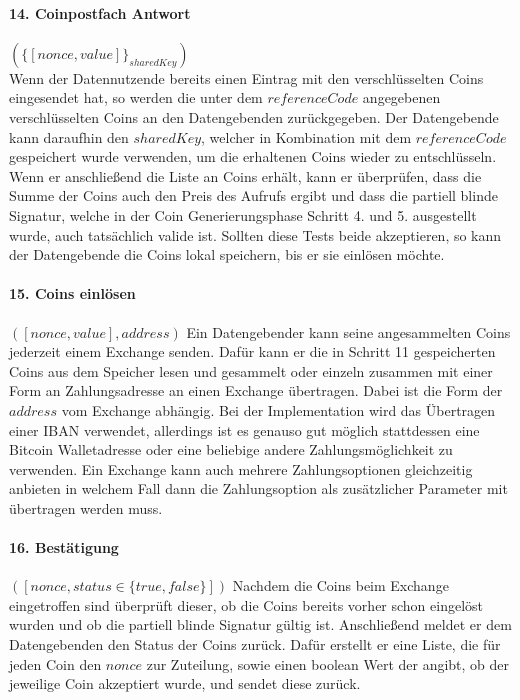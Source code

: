 \documentclass{scrreprt}
\begin{document}
\paragraph{14. Coinpostfach Antwort} $(\{[nonce,value]\}_{sharedKey})$\\
Wenn der Datennutzende bereits einen Eintrag mit den verschlüsselten Coins eingesendet hat, so werden die unter dem $referenceCode$ angegebenen verschlüsselten Coins an den Datengebenden zurückgegeben. Der Datengebende kann daraufhin den $sharedKey$, welcher in Kombination mit dem $referenceCode$ gespeichert wurde verwenden, um die erhaltenen Coins wieder zu entschlüsseln. Wenn er anschließend die Liste an Coins erhält, kann er überprüfen, dass die Summe der Coins auch den Preis des Aufrufs ergibt und dass die partiell blinde Signatur, welche in der Coin Generierungsphase Schritt 4. und 5. ausgestellt wurde, auch tatsächlich valide ist. Sollten diese Tests beide akzeptieren, so kann der Datengebende die Coins lokal speichern, bis er sie einlösen möchte.

\paragraph{15. Coins einlösen} $([nonce,value], address)$
Ein Datengebender kann seine angesammelten Coins jederzeit einem Exchange senden. Dafür kann er die in Schritt 11 gespeicherten Coins aus dem Speicher lesen und gesammelt oder einzeln zusammen mit einer Form an Zahlungsadresse an einen Exchange übertragen. Dabei ist die Form der $address$ vom Exchange abhängig. Bei der Implementation wird das Übertragen einer IBAN verwendet, allerdings ist es genauso gut möglich stattdessen eine Bitcoin Walletadresse oder eine beliebige andere Zahlungsmöglichkeit zu verwenden. Ein Exchange kann auch mehrere Zahlungsoptionen gleichzeitig anbieten in welchem Fall dann die Zahlungsoption als zusätzlicher Parameter mit übertragen werden muss.

\paragraph{16. Bestätigung} $([nonce, status \in \{true, false\}])$
Nachdem die Coins beim Exchange eingetroffen sind überprüft dieser, ob die Coins bereits vorher schon eingelöst wurden und ob die partiell blinde Signatur gültig ist. Anschließend meldet er dem Datengebenden den Status der Coins zurück. Dafür erstellt er eine Liste, die für jeden Coin den $nonce$ zur Zuteilung, sowie einen boolean Wert der angibt, ob der jeweilige Coin akzeptiert wurde, und sendet diese zurück.
\end{document}
